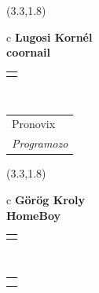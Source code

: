\documentclass[11pt]{article}
\begin{document}
\makebox(3.3,1.8){
  \renewcommand\arraystretch{1.3}
  \begin{tabular}[c]{c}
    \hspace{8.5mm}
    \LARGE\bf{ Lugosi Kornél }\\
    \hspace{8.5mm}
    \Large{ coornail }\\
    \renewcommand\arraystretch{3}
    \begin{tabular}[c]{c}
      \centering
      \fontfamily{phv}\selectfont{
        \textbf{
          \textsc{
            \scriptsize{
            \color{Bright}{ Ismerkedő }\color{Bright}{ Webmester }\color{Bright}{ Sminkmester }\color{Dark}{ Programozó }
            }
          }
        }
      }
    \end{tabular}
    \\
    \renewcommand\arraystretch{1}
    \begin{tabular}{p{3.3in}}
      \hspace{.7cm}Pronovix\\
      \hspace{.7cm}\emph{ Programozo }\\
    \end{tabular}
  \end{tabular}
}

\makebox(3.3,1.8){
  \renewcommand\arraystretch{1.3}
  \begin{tabular}[c]{c}
    \hspace{8.5mm}
    \LARGE\bf{ Görög Kroly }\\
    \hspace{8.5mm}
    \Large{ HomeBoy }\\
    \renewcommand\arraystretch{3}
    \begin{tabular}[c]{c}
      \centering
      \fontfamily{phv}\selectfont{
        \textbf{
          \textsc{
            \scriptsize{
            \color{Dark}{ Ismerkedő }\color{Dark}{ Webmester }\color{Bright}{ Sminkmester }\color{Bright}{ Programozó }
            }
          }
        }
      }
    \end{tabular}
    \\
    \renewcommand\arraystretch{1}
    \begin{tabular}{p{3.3in}}
      \hspace{.7cm}\\
      \hspace{.7cm}\emph{  }\\
    \end{tabular}
  \end{tabular}
}
\end{document}
